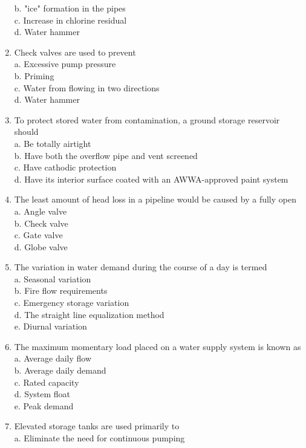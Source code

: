 \begin{enumerate}[1.]
b. "ice" formation in the pipes\\
c. Increase in chlorine residual\\
d. Water hammer\\
\item Check valves are used to prevent\\
a. Excessive pump pressure\\
b. Priming\\
c. Water from flowing in two directions\\
d. Water hammer
\item To protect stored water from contamination, a ground storage reservoir should\\
a. Be totally airtight\\
b. Have both the overflow pipe and vent screened\\
c. Have cathodic protection\\
d. Have its interior surface coated with an AWWA-approved paint system\\
\item The least amount of head loss in a pipeline would be caused by a fully open\\
a. Angle valve\\
b. Check valve\\
c. Gate valve\\
d. Globe valve\\
\item The variation in water demand during the course of a day is termed\\
a. Seasonal variation\\
b. Fire flow requirements\\
c. Emergency storage variation\\
d. The straight line equalization method\\
e. Diurnal variation\\
\item The maximum momentary load placed on a water supply system is known as\\
a. Average daily flow\\
b. Average daily demand\\
c. Rated capacity\\
d. System float\\
e. Peak demand\\
\item Elevated storage tanks are used primarily to\\
a. Eliminate the need for continuous pumping\\

\end{enumerate}
